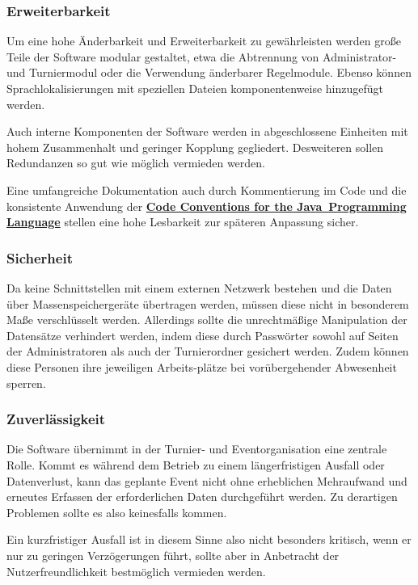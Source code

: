\documentclass[11pt]{article}
\begin{document}
\subsubsection{Erweiterbarkeit}

Um eine hohe Änderbarkeit und Erweiterbarkeit zu gewährleisten werden große Teile der Software modular gestaltet, etwa die Abtrennung von Administrator- und Turniermodul oder die Verwendung änderbarer Regelmodule. Ebenso können Sprachlokalisierungen mit speziellen Dateien komponentenweise hinzugefügt werden.

Auch interne Komponenten der Software werden in abgeschlossene Einheiten mit hohem Zusammenhalt und geringer Kopplung gegliedert. Desweiteren sollen Redundanzen so gut wie möglich vermieden werden.

Eine umfangreiche Dokumentation auch durch Kommentierung im Code und die konsistente Anwendung der \href{http://www.oracle.com/technetwork/java/codeconvtoc-136057.html}{\textbf{Code Conventions for the Java\texttrademark\ Programming Language}} stellen eine hohe Lesbarkeit zur späteren Anpassung sicher.

\subsubsection{Sicherheit}

Da keine Schnittstellen mit einem externen Netzwerk bestehen und die Daten über Massenspeichergeräte übertragen werden, müssen diese nicht in besonderem Maße verschlüsselt werden. Allerdings sollte die unrechtmäßige Manipulation der Datensätze verhindert werden, indem diese durch Passwörter sowohl auf Seiten der Administratoren als auch der Turnierordner gesichert werden. Zudem können diese Personen ihre jeweiligen Arbeits-plätze bei vorübergehender Abwesenheit sperren.

\newpage

\subsubsection{Zuverlässigkeit}

Die Software übernimmt in der Turnier- und Eventorganisation eine zentrale Rolle. Kommt es während dem Betrieb zu einem längerfristigen Ausfall oder Datenverlust, kann das geplante Event nicht ohne erheblichen Mehraufwand und erneutes Erfassen der erforderlichen Daten durchgeführt werden. Zu derartigen Problemen sollte es also keinesfalls kommen.

Ein kurzfristiger Ausfall ist in diesem Sinne also nicht besonders kritisch, wenn er nur zu geringen Verzögerungen führt, sollte aber in Anbetracht der Nutzerfreundlichkeit bestmöglich vermieden werden.
\end{document}
